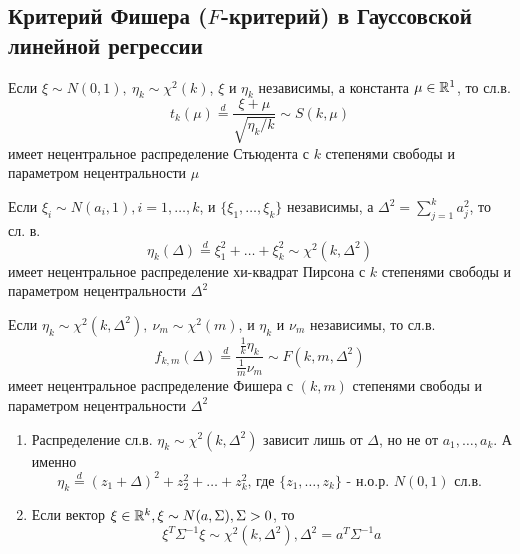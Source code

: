 \subsection{Критерий Фишера (\(F\)-критерий) в Гауссовской линейной регрессии}
\begin{definition}
        Если \(\xi\sim N(0,1),\ \eta_k\sim\chi^2(k)\), \(\xi\) и \(\eta_k\)
        независимы, а константа \(\mu\in\mathbb{R}^1\), то сл.в.
        \[t_k(\mu)\overset{d}{=}\frac{\xi+\mu}{\sqrt{\eta_k/k}}\sim S(k,\mu)\]
        имеет нецентральное распределение Стьюдента с \(k\) степенями свободы
        и параметром нецентральности \(\mu\)
\end{definition}
\begin{definition}
    Если \(\xi_i\sim N(a_i,1),i=1,\ldots,k\), и \(\{\xi_1,\ldots,\xi_k\}\)
    независимы, а \(\Delta^2=\sum_{j=1}^{k}a_j^2\), то сл. в.
    \[ \eta_k(\Delta)\overset{d}{=}\xi_1^2+\ldots+\xi_k^2\sim\chi^2(k,\Delta^2) \]
    имеет нецентральное распределение хи-квадрат Пирсона с \(k\) степенями свободы
    и параметром нецентральности \(\Delta^2\)
\end{definition}
\begin{definition}
    Если \(\eta_k\sim\chi^2(k,\Delta^2),\ \nu_m\sim\chi^2(m)\), и \(\eta_k\) и \(\nu_m\)
    независимы, то сл.в.
    \[f_{k,m}(\Delta)\overset{d}{=}\frac{\frac{1}{k}\eta_k}{\frac{1}{m}\nu_m}\sim F(k,m,\Delta^2)\]
    имеет нецентральное распределение Фишера с \((k,m)\) степенями свободы и параметром
    нецентральности \(\Delta^2\)
\end{definition}
\begin{lemma} \label{delta_dependency}
    \begin{enumerate}
        \item Распределение сл.в. \(\eta_k\sim\chi^2(k,\Delta^2)\) зависит лишь
            от \(\Delta\), но не от \(a_1,\ldots,a_k\). А именно
            \[\eta_k\overset{d}{=}(z_1+\Delta)^2+z_2^2+\ldots+z_k^2\mbox{, где \(\{z_1,\ldots,z_k\}\) - н.о.р. \(N(0,1)\) сл.в. } \]

        \item Если вектор \(\xi\in\mathbb{R}^k,\xi\sim N(a, \Sigma),\Sigma>0\), то
        \[\xi^T\Sigma^{-1}\xi\sim\chi^2(k,\Delta^2),\Delta^2 = a^{T}\Sigma^{-1}a\]
    \end{enumerate}
\end{lemma}
